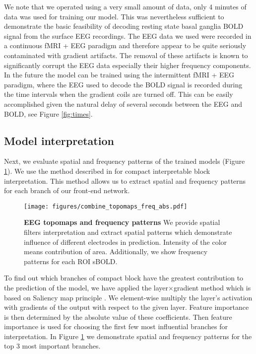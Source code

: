 \documentclass{article}
\begin{document}
We note that we operated using a very small amount of data, only 4 minutes of data was used for training our model. This was nevertheless sufficient to demonstrate the basic feasibility of decoding resting state basal ganglia BOLD signal from the surface EEG recordings. The EEG data we used were recorded in a continuous fMRI + EEG paradigm and therefore appear to be quite seriously contaminated with gradient artifacts. The removal of these artifacts is known to significantly corrupt the EEG data especially their higher frequency components. In the future the model can be trained using the intermittent fMRI + EEG paradigm, where the EEG  used to decode the BOLD signal is recorded during the time intervals when the gradient coils are turned off. This can be easily accomplished given the natural delay of several seconds between the EEG and BOLD, see Figure \ref{fig:times}.







\subsection{Model interpretation}
Next, we evaluate spatial and frequency patterns of the trained models (Figure \ref{fig:topomap}). We use the method described in \cite{petrosyan2021decoding} for compact interpretable block interpretation. This method allows us to extract spatial and frequency patterns for each branch of our front-end network.  

 \begin{figure}[ht]
    \centering
    \texttt{[image: figures/combine\_topomaps\_freq\_abs.pdf]}
    \caption{\label{fig:topomap} \textbf{EEG topomaps and frequency patterns} We provide spatial filters interpretation and extract spatial patterns which demonstrate influence of different electrodes in prediction. Intensity of the color means contribution of area. Additionally, we show frequency patterns for each ROI sBOLD.
     }
\end{figure}

To find out which branches of compact block have the greatest contribution to the prediction of the model, we have applied the layer$\times$gradient method which is based on Saliency map principle \cite{saliency}. We element-wise multiply the layer's activation with gradients of the output with respect to the given layer. Feature importance is then determined by the absolute value of these coefficients. Then feature importance is used for choosing the first few most influential branches for  interpretation. In Figure \ref{fig:topomap} we demonstrate spatial and frequency patterns for the top 3 most important branches.
\end{document}
